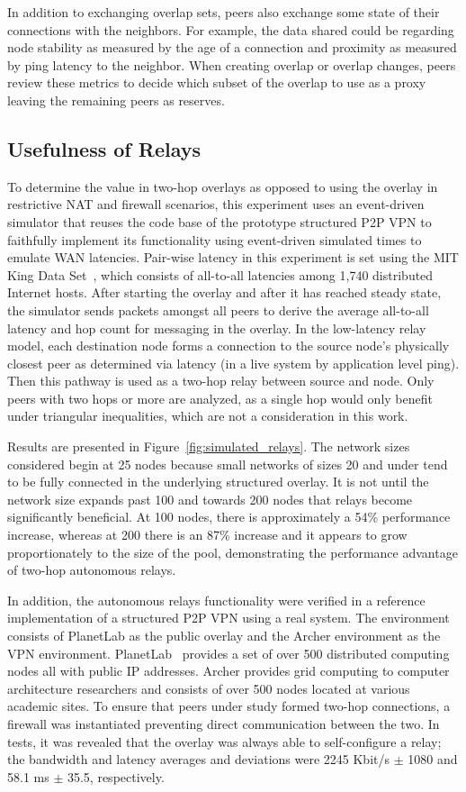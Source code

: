 In addition to exchanging overlap sets, peers also exchange some state of their
connections with the neighbors.  For example, the data shared could be
regarding node stability as measured by the age of a connection and proximity
as measured by ping latency to the neighbor.  When creating overlap or overlap
changes, peers review these metrics to decide which subset of the overlap to
use as a proxy leaving the remaining peers as reserves.

\subsection{Usefulness of Relays}
To determine the value in two-hop overlays as opposed to using the overlay in
restrictive NAT and firewall scenarios, this experiment uses an event-driven
simulator that reuses the code base of the prototype structured P2P VPN to
faithfully implement its functionality using event-driven simulated times to
emulate WAN latencies.  Pair-wise latency in this experiment is set using the
MIT King Data Set~\cite{king_data}, which consists of all-to-all latencies
among 1,740 distributed Internet hosts.  After starting the overlay and after
it has reached steady state, the simulator sends packets amongst all peers to
derive the average all-to-all latency and hop count for messaging in the
overlay.  In the low-latency relay model, each destination node forms a
connection to the source node's physically closest peer as determined via
latency (in a live system by application level ping).  Then this pathway is
used as a two-hop relay between source and node.  Only peers with two hops or
more are analyzed, as a single hop would only benefit under triangular
inequalities, which are not a consideration in this work.

Results are presented in Figure~\ref{fig:simulated_relays}. The network sizes
considered begin at 25 nodes because small networks of sizes 20 and under tend
to be fully connected in the underlying structured overlay.  It is not until
the network size expands past 100 and towards 200 nodes that relays become
significantly beneficial.  At 100 nodes, there is approximately a 54\%
performance increase, whereas at 200 there is an 87\% increase and it appears
to grow proportionately to the size of the pool, demonstrating the performance
advantage of two-hop autonomous relays.

In addition, the autonomous relays functionality were verified in a reference
implementation of a structured P2P VPN using a real system.  The environment
consists of PlanetLab as the public overlay and the Archer environment as the
VPN environment.  PlanetLab~\cite{planetlab} provides a set of over 500
distributed computing nodes all with public IP addresses.  Archer provides grid
computing to computer architecture researchers and consists of over 500 nodes
located at various academic sites.  To ensure that peers under study formed
two-hop connections, a firewall was instantiated preventing direct communication
between the two.  In tests, it was revealed that the overlay was always able to
self-configure a relay; the bandwidth and latency averages and deviations were
2245 Kbit/s $\pm$ 1080 and 58.1 ms $\pm$ 35.5, respectively.

